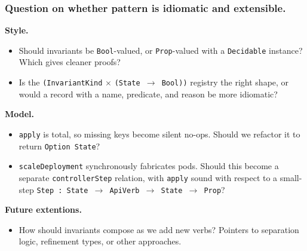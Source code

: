 \documentclass[10pt,aspectratio=169]{beamer}
\begin{document}
\begin{frame}
\frametitle{\normalsize Question on whether pattern is idiomatic and extensible.}
\small
\textbf{Style.}
\begin{itemize}\itemsep0.15em
  \item Should invariants be \texttt{Bool}-valued, or \texttt{Prop}-valued with a \texttt{Decidable} instance? Which gives cleaner proofs?
  \item Is the \texttt{(InvariantKind} $\times$ \texttt{(State $\to$ Bool))} registry the right shape, or would a record with a name, predicate, and reason be more idiomatic?
\end{itemize}
\textbf{Model.}
\begin{itemize}\itemsep0.15em
  \item \texttt{apply} is total, so missing keys become silent no-ops. Should we refactor it to return \texttt{Option State}?
  \item \texttt{scaleDeployment} synchronously fabricates pods. Should this become a separate \texttt{controllerStep} relation, with \texttt{apply} sound with respect to a small-step \texttt{Step : State $\to$ ApiVerb $\to$ State $\to$ Prop}?
\end{itemize}
\textbf{Future extentions.}
\begin{itemize}\itemsep0.15em
  \item How should invariants compose as we add new verbs? Pointers to separation logic, refinement types, or other approaches.
\end{itemize}
\end{frame}
\end{document}
